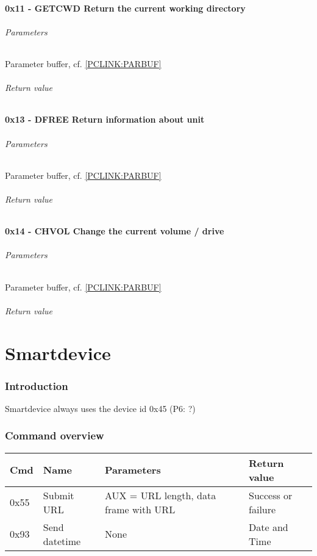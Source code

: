 \documentclass[10pt]{article}
\begin{document}
\subsection{0x11 - GETCWD Return the current working directory }
\paragraph{Parameters}
Parameter buffer, cf. \ref{PCLINK:PARBUF}

\paragraph{Return value}

\subsection{0x13 - DFREE Return information about unit }
\paragraph{Parameters}
Parameter buffer, cf. \ref{PCLINK:PARBUF}

\paragraph{Return value}

\subsection{0x14 - CHVOL Change the current volume / drive }
\paragraph{Parameters}
Parameter buffer, cf. \ref{PCLINK:PARBUF}

\paragraph{Return value}

\part{Smartdevice}
\section{Introduction}
Smartdevice always uses the device id 0x45 (P6: ?)

\section{Command overview}
\begin{tabular}[h!]{l|l|l|l}
Cmd & Name & Parameters & Return value \\ \hline 
0x55 & Submit URL & AUX = URL length, data frame with URL & Success or failure \\
0x93 & Send datetime & None & Date and Time
\end{tabular}
\end{document}
